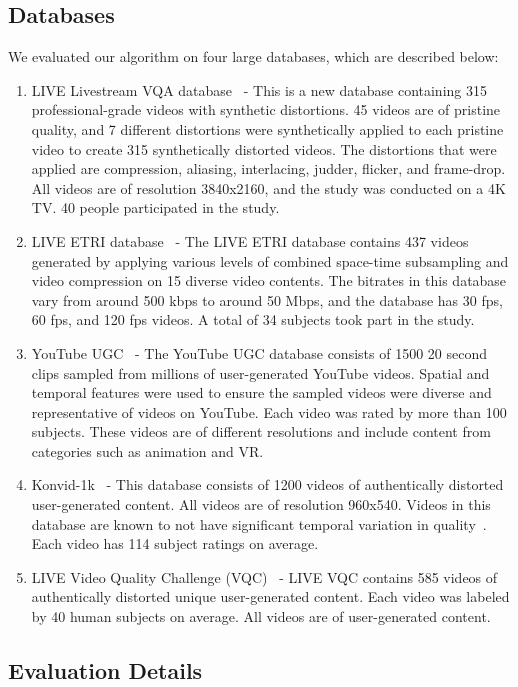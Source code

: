 \documentclass[journal]{IEEEtran}
\begin{document}
\subsection{Databases}
We evaluated our algorithm on four large databases, which are described below:
\begin{enumerate}
    \item LIVE Livestream VQA database~\cite{livestream} - 
    This is a new database containing 315 professional-grade videos with synthetic distortions. 45 videos are of pristine quality, and 7 different distortions were synthetically applied to each pristine video to create 315 synthetically distorted videos. The distortions that were applied are compression, aliasing, interlacing, judder, flicker, and frame-drop. All videos are of resolution 3840x2160, and the study was conducted on a 4K TV. 40 people participated in the study.
    \item LIVE ETRI database~\cite{etri} - The LIVE ETRI database contains 437 videos generated by applying various levels of combined space-time subsampling and video compression on 15 diverse video contents. The bitrates in this database vary from around 500 kbps to around 50 Mbps, and the database has 30 fps, 60 fps, and 120 fps videos. A total of 34 subjects took part in the study.
    \item YouTube UGC~\cite{youtube_ugc} - The YouTube UGC database consists of 1500 20 second clips sampled from millions of user-generated YouTube videos. Spatial and temporal features were used to ensure the sampled videos were diverse and representative of videos on YouTube. Each video was rated by more than 100 subjects. These videos are of different resolutions and include content from categories such as animation and VR.
    \item Konvid-1k~\cite{konvid} - This database consists of 1200 videos of authentically distorted user-generated content. All videos are of resolution 960x540. Videos in this database are known to not have significant temporal variation in quality~\cite{videval,pooling}. Each video has 114 subject ratings on average.
    \item LIVE Video Quality Challenge (VQC)~\cite{vqc} - LIVE VQC contains 585 videos of authentically distorted unique user-generated content. Each video was labeled by 40 human subjects on average. All videos are of user-generated content.
\end{enumerate}
\vspace{-3mm}
\subsection{Evaluation Details}
\end{document}
